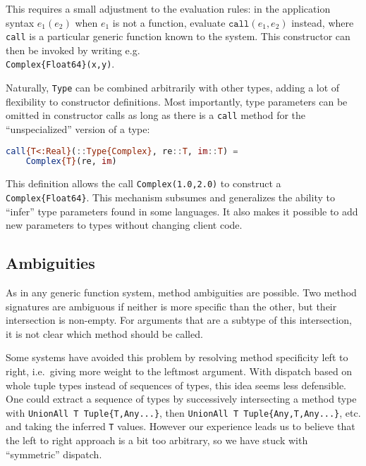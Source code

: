 \noindent
This requires a small adjustment to the evaluation rules: in the application
syntax $e_1(e_2)$ when $e_1$ is not a function,
evaluate $\texttt{call}(e_1,e_2)$ instead, where \texttt{call} is
a particular generic function known to the system.
This constructor can then be invoked by writing e.g.\ \\
\texttt{Complex\{Float64\}(x,y)}.

Naturally, \texttt{Type} can be combined arbitrarily with other types,
adding a lot of flexibility to constructor definitions.
Most importantly, type parameters can be omitted in constructor calls
as long as there is a \texttt{call} method for the ``unspecialized'' version
of a type:

\begin{singlespace}
\begin{lstlisting}[language=julia]
call{T<:Real}(::Type{Complex}, re::T, im::T) =
    Complex{T}(re, im)
\end{lstlisting}
\end{singlespace}

This definition allows the call \texttt{Complex(1.0,2.0)} to
construct a \texttt{Complex\{Float64\}}.
This mechanism subsumes and generalizes the ability to ``infer''
type parameters found in some languages.
It also makes it possible to add new parameters to types without
changing client code.

\subsection{Ambiguities}

As in any generic function system, method ambiguities are possible.
Two method signatures are ambiguous if neither is more specific than
the other, but their intersection is non-empty.
For arguments that are a subtype of this intersection, it is not
clear which method should be called.

Some systems have avoided this problem by resolving method
specificity left to right, i.e.\ giving more weight to the leftmost
argument.
With dispatch based on whole tuple types instead of sequences of
types, this idea seems less defensible.
One could extract a sequence of types by successively
intersecting a method type with \texttt{UnionAll T Tuple\{T,Any...\}},
then \texttt{UnionAll T Tuple\{Any,T,Any...\}}, etc. and taking the
inferred \texttt{T} values.
However our experience leads us to believe that the left to right
approach is a bit too arbitrary, so we have stuck with ``symmetric''
dispatch.

